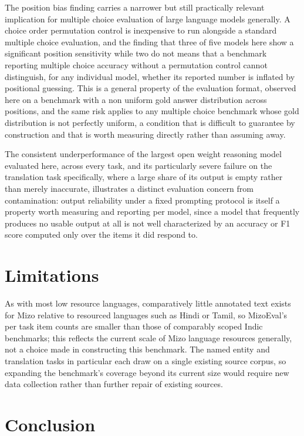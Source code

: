 \documentclass[pdflatex,sn-mathphys-ay]{sn-jnl}
\begin{document}
The position bias finding carries a narrower but still practically relevant implication for multiple choice evaluation of large language models generally. A choice order permutation control is inexpensive to run alongside a standard multiple choice evaluation, and the finding that three of five models here show a significant position sensitivity while two do not means that a benchmark reporting multiple choice accuracy without a permutation control cannot distinguish, for any individual model, whether its reported number is inflated by positional guessing. This is a general property of the evaluation format, observed here on a benchmark with a non uniform gold answer distribution across positions, and the same risk applies to any multiple choice benchmark whose gold distribution is not perfectly uniform, a condition that is difficult to guarantee by construction and that is worth measuring directly rather than assuming away.

The consistent underperformance of the largest open weight reasoning model evaluated here, across every task, and its particularly severe failure on the translation task specifically, where a large share of its output is empty rather than merely inaccurate, illustrates a distinct evaluation concern from contamination: output reliability under a fixed prompting protocol is itself a property worth measuring and reporting per model, since a model that frequently produces no usable output at all is not well characterized by an accuracy or F1 score computed only over the items it did respond to.

\section{Limitations}
\label{sec:limitations}

As with most low resource languages, comparatively little annotated text exists for Mizo relative to resourced languages such as Hindi or Tamil, so MizoEval's per task item counts are smaller than those of comparably scoped Indic benchmarks; this reflects the current scale of Mizo language resources generally, not a choice made in constructing this benchmark. The named entity and translation tasks in particular each draw on a single existing source corpus, so expanding the benchmark's coverage beyond its current size would require new data collection rather than further repair of existing sources.

\section{Conclusion}
\label{sec:conclusion}
\end{document}
